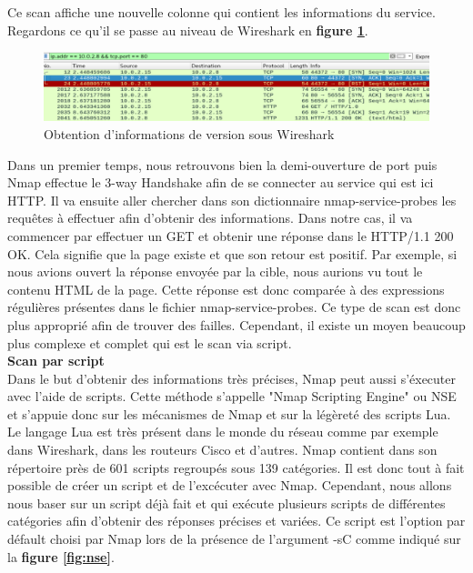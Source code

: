 \newpage
Ce scan affiche une nouvelle colonne qui contient les informations du service. Regardons ce qu'il se passe au niveau de Wireshark en \textbf{figure \ref{fig:svwire}}.

\begin{figure}[htp!]
  \centering
  \setlength\figureheight{7cm}
  \setlength\figurewidth{9cm}
  \includegraphics[width=1\textwidth]{oui/images/nmap/Wireversion.PNG}
  \caption{Obtention d'informations de version sous Wireshark}
  \label{fig:svwire}
\end{figure}

Dans un premier temps, nous retrouvons bien la demi-ouverture de port puis Nmap effectue le 3-way Handshake afin de se connecter au service qui est ici HTTP. Il va ensuite aller chercher dans son dictionnaire nmap-service-probes les requêtes à effectuer afin d'obtenir des informations. Dans notre cas, il va commencer par effectuer un GET et obtenir une réponse dans le HTTP/1.1 200 OK. Cela signifie que la page existe et que son retour est positif. Par exemple, si nous avions ouvert la réponse envoyée par la cible, nous aurions vu tout le contenu HTML de la page. Cette réponse est donc comparée à des expressions régulières présentes dans le fichier nmap-service-probes. Ce type de scan est donc plus approprié afin de trouver des failles. Cependant, il existe un moyen beaucoup plus complexe et complet qui est le scan via script.\\

 \textbf{Scan par script}\\

Dans le but d'obtenir des informations très précises, Nmap peut aussi s'éxecuter avec l'aide de scripts. Cette méthode s'appelle "Nmap Scripting Engine" ou NSE et s'appuie donc sur les mécanismes de Nmap et sur la légèreté des scripts Lua. Le langage Lua est très présent dans le monde du réseau comme par exemple dans Wireshark, dans les routeurs Cisco et d'autres. Nmap contient dans son répertoire près de 601 scripts regroupés sous 139 catégories. Il est donc tout à fait possible de créer un script et de l'excécuter avec Nmap. Cependant, nous allons nous baser sur un script déjà fait et qui exécute plusieurs scripts de différentes catégories afin d'obtenir des réponses précises et variées. Ce script est l'option par défault choisi par Nmap lors de la présence de l'argument -sC comme indiqué sur la \textbf{figure \ref{fig:nse}}.\\

